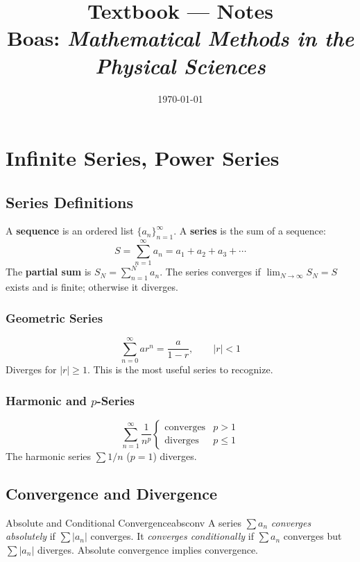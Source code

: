 \documentclass[11pt, letterpaper]{article}
\title{%
  \textbf{Textbook — Notes}\\[4pt]
  \large Boas: \textit{Mathematical Methods in the Physical Sciences}
}
\author{}
\date{\today}
\theoremstyle{plain}
\begin{document}


\maketitle
\tableofcontents
\newpage


\section{Infinite Series, Power Series}        %

\subsection{Series Definitions}

A \textbf{sequence} is an ordered list $\{a_n\}_{n=1}^\infty$. A \textbf{series}
is the sum of a sequence:
\[
    S = \sum_{n=1}^{\infty} a_n = a_1 + a_2 + a_3 + \cdots
\]
The \textbf{partial sum} is $S_N = \sum_{n=1}^N a_n$.
The series converges if $\lim_{N\to\infty} S_N = S$ exists and is finite;
otherwise it diverges.

\subsubsection*{Geometric Series}
\[
    \sum_{n=0}^{\infty} ar^n = \frac{a}{1-r}, \qquad |r| < 1
\]
Diverges for $|r| \geq 1$. This is the most useful series to recognize.

\subsubsection*{Harmonic and $p$-Series}
\[
    \sum_{n=1}^{\infty} \frac{1}{n^p} \begin{cases}
        \text{converges} & p > 1 \\
        \text{diverges}  & p \leq 1
    \end{cases}
\]
The harmonic series $\sum 1/n$ ($p=1$) diverges.


\subsection{Convergence and Divergence}

\begin{definition}{Absolute and Conditional Convergence}{absconv}
    A series $\sum a_n$ \emph{converges absolutely} if $\sum |a_n|$ converges.
    It \emph{converges conditionally} if $\sum a_n$ converges but
    $\sum |a_n|$ diverges. Absolute convergence implies convergence.
\end{definition}
\end{document}

